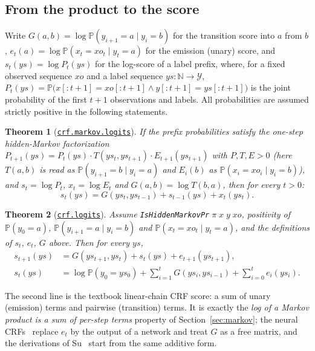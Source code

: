 \documentclass[11pt,a4paper]{article}
\newcommand{\lmod}[2]{\href{http://www.lemma.cn/lean/?module=#2}{\nolinkurl{#1}}}
\newtheorem{theorem}{Theorem}[section]
\newcommand{\N}{\mathbb{N}}
\newcommand{\Prb}{\mathbb{P}}
\newcommand{\Y}{\mathcal{Y}}
\begin{document}
\subsection{From the product to the score}
\label{sec:score}
Write $G(a,b)=\log\Prb(y_{i+1}=a\mid y_i=b)$ for the transition score into $a$ from $b$, $e_t(a)=\log\Prb(x_t=xo_t\mid y_t=a)$ for the emission (unary) score, and $s_t(ys)=\log P_t(ys)$ for the log-score of a label prefix, where, for a fixed observed sequence $xo$ and a label sequence $ys:\N\to\Y$, $P_t(ys)=\Prb\bigl(x[{:}t{+}1]=xo[{:}t{+}1]\wedge y[{:}t{+}1]=ys[{:}t{+}1]\bigr)$ is the joint probability of the first $t+1$ observations and labels.
All probabilities are assumed strictly positive in the following statements.

\begin{theorem}[\lmod{crf.markov.logits}{Tensor.Eq.of.Ne_0.Eq.Eq.Eq.Eq_log.Eq_log.Eq_log}]
\label{thm:logits0}
If the prefix probabilities satisfy the one-step hidden-Markov factorization $P_{t+1}(ys)=P_t(ys)\cdot T(ys_t,ys_{t+1})\cdot E_{t+1}(ys_{t+1})$ with $P,T,E>0$ (here $T(a,b)$ is read as $\Prb(y_{i+1}=b\mid y_i=a)$ and $E_i(b)$ as $\Prb(x_i=xo_i\mid y_i=b)$), and $s_t=\log P_t$, $x_t=\log E_t$ and $G(a,b)=\log T(b,a)$, then for every $t>0$:
\[
s_t(ys)=G(ys_t,ys_{t-1})+s_{t-1}(ys)+x_t(ys_t).
\]
\end{theorem}

\begin{theorem}[\lmod{crf.logits}{Tensor.Imp.of.Eq}]
\label{thm:logits}
Assume \texttt{IsHiddenMarkovPr}$\;\pi\;x\;y\;xo$, positivity of $\Prb(y_0=a)$, $\Prb(y_{i+1}=a\mid y_i=b)$ and $\Prb(x_t=xo_t\mid y_t=a)$, and the definitions of $s_t$, $e_t$, $G$ above.
Then for every $ys$,
\begin{align*}
s_{t+1}(ys)&=G(ys_{t+1},ys_t)+s_t(ys)+e_{t+1}(ys_{t+1}),\\
s_t(ys)&=\log\Prb(y_0=ys_0)+\sum_{i=1}^{t}G(ys_i,ys_{i-1})+\sum_{i=0}^{t}e_i(ys_i).
\end{align*}
\end{theorem}
The second line is the textbook linear-chain CRF score: a sum of unary (emission) terms and pairwise (transition) terms.
It is exactly the \emph{log of a Markov product is a sum of per-step terms} property of Section~\ref{sec:markov}; the neural CRFs~\cite{huang2015bilstmcrf,lample2016ner,ma2016bilstmcnnscrf} replace $e_t$ by the output of a network and treat $G$ as a free matrix, and the derivations of Su~\cite{su2017crf} start from the same additive form.
\end{document}
